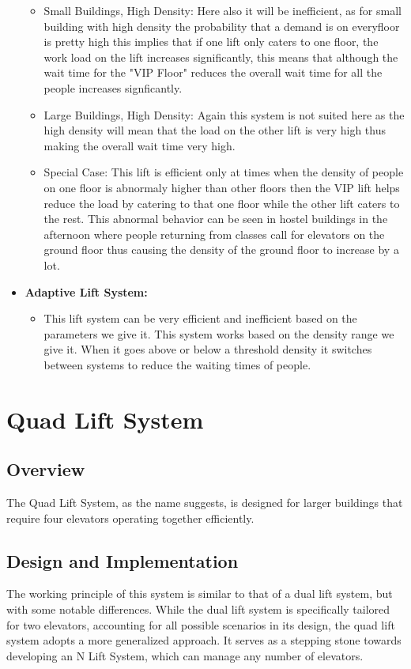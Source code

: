 \documentclass[12pt,a4paper]{report}
\begin{document}
\begin{itemize}
\begin{itemize}
        \item Small Buildings, High Density: Here also it will be inefficient, as for small building with high density the probability that a demand is on everyfloor is pretty high this implies that if one lift only caters to one floor, the work load on the lift increases significantly, this means that although the wait time for the "VIP Floor" reduces the overall wait time for all the people increases signficantly.
        \item Large Buildings, High Density: Again this system is not suited here as the high density will mean that the load on the other lift is very high thus making the overall wait time very high.
        \item Special Case: This lift is efficient only at times when the density of people on one floor is abnormaly higher than other floors then the VIP lift helps reduce the load by catering to that one floor while the other lift caters to the rest. This abnormal behavior can be seen in hostel buildings in the afternoon where people returning from classes call for elevators on the ground floor thus causing the density of the ground floor to increase by a lot.
    \end{itemize}
    \item \textbf{Adaptive Lift System:}
    \begin{itemize}
        \item This lift system can be very efficient and inefficient based on the parameters we give it. This system works based on the density range we give it. When it goes above or below a threshold density it switches between systems to reduce the waiting times of people.
    \end{itemize}
\end{itemize}


\chapter{Quad Lift System}
\section{Overview}
The Quad Lift System, as the name suggests, is designed for larger buildings that require four elevators operating together efficiently.

\section{Design and Implementation}
The working principle of this system is similar to that of a dual lift system, but with some notable differences. While the dual lift system is specifically tailored for two elevators, accounting for all possible scenarios in its design, the quad lift system adopts a more generalized approach. It serves as a stepping stone towards developing an N Lift System, which can manage any number of elevators.
\end{document}
